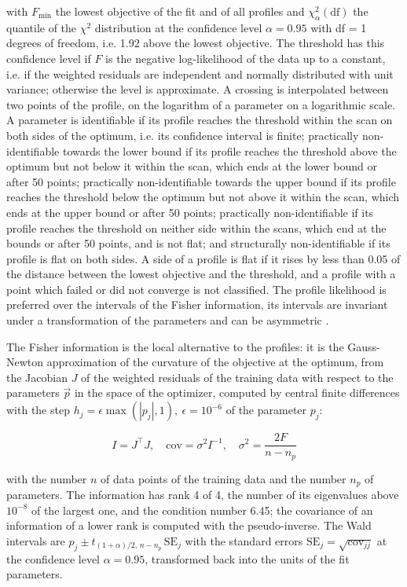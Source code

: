 with $F_{\min}$ the lowest objective of the fit and of all profiles and $\chi^2_{\alpha}(\mathrm{df})$ the quantile of the $\chi^2$ distribution at the confidence level $\alpha = 0.95$ with df = 1 degrees of freedom, i.e. 1.92 above the lowest objective. The threshold has this confidence level if $F$ is the negative log-likelihood of the data up to a constant, i.e. if the weighted residuals are independent and normally distributed with unit variance; otherwise the level is approximate. A crossing is interpolated between two points of the profile, on the logarithm of a parameter on a logarithmic scale. A parameter is identifiable if its profile reaches the threshold within the scan on both sides of the optimum, i.e. its confidence interval is finite; practically non-identifiable towards the lower bound if its profile reaches the threshold above the optimum but not below it within the scan, which ends at the lower bound or after 50 points; practically non-identifiable towards the upper bound if its profile reaches the threshold below the optimum but not above it within the scan, which ends at the upper bound or after 50 points; practically non-identifiable if its profile reaches the threshold on neither side within the scans, which end at the bounds or after 50 points, and is not flat; and structurally non-identifiable if its profile is flat on both sides. A side of a profile is flat if it rises by less than 0.05 of the distance between the lowest objective and the threshold, and a profile with a point which failed or did not converge is not classified. The profile likelihood is preferred over the intervals of the Fisher information, its intervals are invariant under a transformation of the parameters and can be asymmetric \cite{Wieland2021}.

The Fisher information is the local alternative to the profiles: it is the Gauss-Newton approximation of the curvature of the objective at the optimum, from the Jacobian $J$ of the weighted residuals of the training data with respect to the parameters $\vec{p}$ in the space of the optimizer, computed by central finite differences with the step $h_j = \epsilon \max(|p_j|, 1),\ \epsilon = 10^{-6}$ of the parameter $p_j$:

\begin{equation}
I = J^\top J, \quad \mathrm{cov} = \sigma^2 I^{-1}, \quad \sigma^2 = \frac{2 F}{n - n_p}
\end{equation}

with the number $n$ of data points of the training data and the number $n_p$ of parameters. The information has rank 4 of 4, the number of its eigenvalues above $10^{-8}$ of the largest one, and the condition number 6.45; the covariance of an information of a lower rank is computed with the pseudo-inverse. The Wald intervals are $\hat{p}_j \pm t_{(1+\alpha)/2,\, n-n_p}\, \mathrm{SE}_j$ with the standard errors $\mathrm{SE}_j = \sqrt{\mathrm{cov}_{jj}}$ at the confidence level $\alpha = 0.95$, transformed back into the units of the fit parameters.

